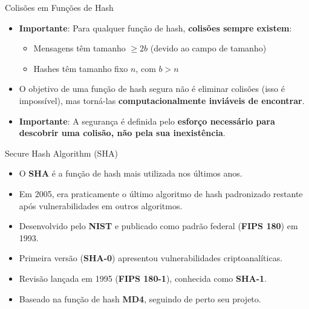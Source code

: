 \begin{frame}{Colisões em Funções de Hash}
    \begin{itemize}
        \item \textbf{Importante}: Para qualquer função de hash, \textbf{colisões sempre existem}:
              \begin{itemize}
                  \item Mensagens têm tamanho $\ge 2b$ (devido ao campo de tamanho)
                  \item Hashes têm tamanho fixo $n$, com $b > n$
              \end{itemize}
        \item O objetivo de uma função de hash segura não é eliminar colisões (isso é impossível),
              mas torná-las \textbf{computacionalmente inviáveis de encontrar}.
        \item \textbf{Importante}: A segurança é definida pelo \textbf{esforço necessário para descobrir uma colisão, não pela sua inexistência}.
    \end{itemize}
\end{frame}

\begin{frame}{Secure Hash Algorithm (SHA)}
    \begin{itemize}
        \item O \textbf{SHA} é a função de hash mais utilizada nos últimos anos.
        \item Em 2005, era praticamente o último algoritmo de hash padronizado restante após vulnerabilidades em outros algoritmos.
        \item Desenvolvido pelo \textbf{NIST} e publicado como padrão federal (\textbf{FIPS 180}) em 1993.
        \item Primeira versão (\textbf{SHA-0}) apresentou vulnerabilidades criptoanalíticas.
        \item Revisão lançada em 1995 (\textbf{FIPS 180-1}), conhecida como \textbf{SHA-1}.
        \item Baseado na função de hash \textbf{MD4}, seguindo de perto seu projeto.
    \end{itemize}
\end{frame}

